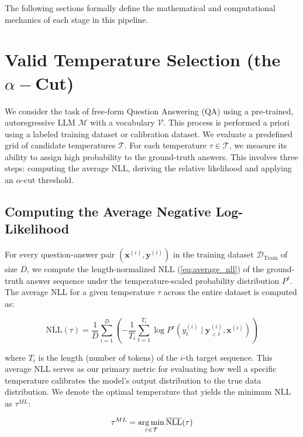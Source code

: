 The following sections formally define the mathematical and 
computational mechanics of each stage in this pipeline.




\section{Valid Temperature Selection (the $\alpha-$Cut)}
\label{sec:methodology:temperature_selection}
We consider the task of free-form Question Answering (QA) using a 
pre-trained, autoregressive LLM $\mathcal{M}$ with a vocabulary 
$\mathcal{V}$. This process is performed a priori using a labeled
training dataset or calibration dataset.
We evaluate a predefined grid of candidate temperatures $\mathcal{T}$.
For each temperature $\tau \in \mathcal{T}$, we measure its ability to
assign high probability to the ground-truth answers. This involves
three steps: computing the average NLL, deriving the relative 
likelihood and applying an $\alpha$-cut threshold.

\subsection{Computing the Average Negative Log-Likelihood}
\label{sec:methodology:temperature_selection:average_nll}
For every question-answer pair $(\mathbf{x}^{(i)}, \mathbf{y}^{(i)})$ in the 
training dataset $\mathcal{D}_{\text{Train}}$ of size $D$, we compute the 
length-normalized NLL (\ref{eq:average_nll}) of the ground-truth answer 
sequence under the temperature-scaled probability distribution $P^{\tau}$.
The average NLL for a given temperature $\tau$ across the entire 
dataset is computed as: 

\begin{equation}
    \overline{\text{NLL}}(\tau) = 
	\frac{1}{D} \sum_{i=1}^{D} \left( - \frac{1}{T_i} 
	\sum_{t=1}^{T_i} \log P^\tau(y_t^{(i)} \mid 
    \mathbf{y}_{<t}^{(i)}, \mathbf{x}^{(i)}) \right)
    \label{eq:temperature_nll}
\end{equation}

where $T_i$ is the length (number of tokens) of the $i$-th target 
sequence. This average NLL serves as our primary metric for evaluating
how well a specific temperature calibrates the model's output 
distribution to the true data distribution. We denote the optimal  
temperature that yields the minimum $\overline{\text{NLL}}$ as $\tau^{ML}$:

\begin{equation}
    \tau^{ML} = \operatorname*{arg\,min}_{\tau \in \mathcal{T}} 
    \overline{\text{NLL}}(\tau)
    \label{eq:temperature_mle}
\end{equation}

